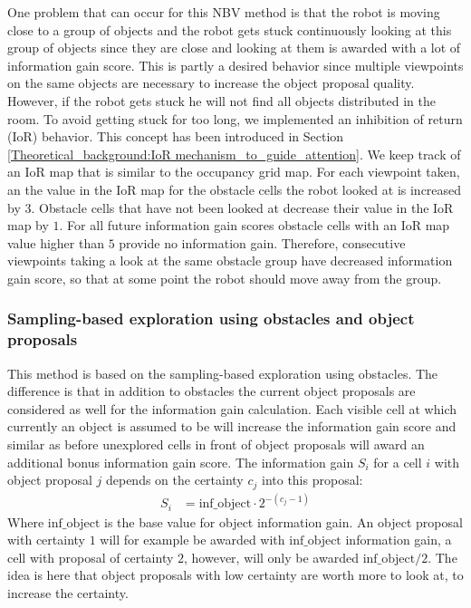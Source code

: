 \documentclass[a4paper,11pt,english]{article}
\begin{document}
One problem that can occur for this NBV method is that the robot is moving close to a group of objects and the robot gets stuck continuously looking at this group of objects since they are close and looking at them is awarded with a lot of information gain score.
This is partly a desired behavior since multiple viewpoints on the same objects are necessary to increase the object proposal quality. However, if the robot gets stuck he will not find all objects distributed in the room.
To avoid getting stuck for too long, we implemented an inhibition of return (IoR) behavior. This concept has been introduced in Section \ref{Theoretical_background:IoR mechanism_to_guide_attention}.
We keep track of an IoR map that is similar to the occupancy grid map.
For each viewpoint taken, an the value in the IoR map for the obstacle cells the robot looked at is increased by $3$.
Obstacle cells that have not been looked at decrease their value in the IoR map by $1$.
For all future information gain scores obstacle cells with an IoR map value higher than $5$ provide no information gain.
Therefore, consecutive viewpoints taking a look at the same obstacle group have decreased information gain score, so that at some point the robot should move away from the group.

\subsubsection{Sampling-based exploration using obstacles and object proposals}
This method is based on the sampling-based exploration using obstacles.
The difference is that in addition to obstacles the current object proposals are considered as well for the information gain calculation.
Each visible cell at which currently an object is assumed to be will increase the information gain score and similar as before unexplored cells in front of object proposals will award an additional bonus information gain score.
The information gain $S_i$ for a cell $i$ with object proposal $j$ depends on the certainty $c_j$ into this proposal:
\begin{align*}
 S_i &= \mbox{inf\_object}\cdot 2^{-(c_j-1)}
\end{align*}
Where $\mbox{inf\_object}$ is the base value for object information gain. An object proposal with certainty $1$ will for example be awarded with $\mbox{inf\_object}$ information gain, a cell with proposal of certainty $2$, however, will only be awarded $\mbox{inf\_object}/2$.
The idea is here that object proposals with low certainty are worth more to look at, to increase the certainty.
\end{document}
